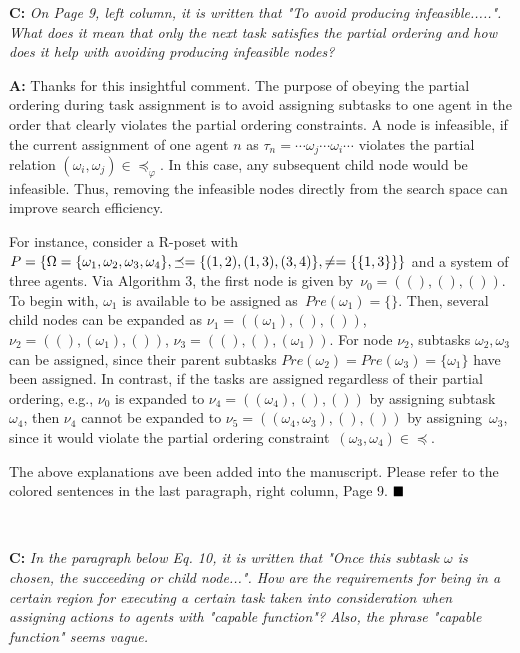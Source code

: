 \documentclass[10pt]{article}
\begin{document}


\textbf{C:}
\emph{On Page 9, left column, it is written that "To avoid producing
	infeasible.....". What does it mean that only the next task satisfies
	the partial ordering and how does it help with avoiding producing
	infeasible nodes?
}

\textbf{A:} Thanks for this insightful comment.
The purpose of obeying the partial ordering during task assignment
is to avoid assigning subtasks to one agent in the order that clearly
violates the partial ordering constraints. A node is infeasible,
if the current assignment of one agent $n$ as $\tau_n=\cdots\omega_j\cdots\omega_i\cdots$ violates the partial relation $(\omega_i,\omega_j)\in\preceq_\varphi$.
In this case, any subsequent child node would be infeasible.
Thus, removing the infeasible nodes directly from the search space can
improve search efficiency.

For instance,
consider a R-poset with $P=\{\Omega=\{\omega_1,\omega_2,\omega_3,\omega_4\},
\preceq=\{(1,2),\\(1,3),(3,4)\}, \neq=\{\{1,3\}\}\}$ and a system of three agents.
Via Algorithm 3, the first node is given by~$\nu_0=((),(),())$.
To begin with, $\omega_1$ is available to be assigned as~$Pre(\omega_1)=\{\}$.
Then, several child nodes can be expanded as
$\nu_1=((\omega_1),(),())$, $\nu_2=((),(\omega_1),())$, $\nu_3=((),(),(\omega_1))$.
For node $\nu_2$, subtasks $\omega_2,\omega_3$
can be assigned, since their parent subtasks $Pre(\omega_2)=Pre(\omega_3)=\{\omega_1\}$ have been assigned.
In contrast, if the tasks are assigned regardless of their partial ordering, e.g.,
$\nu_0$ is expanded to $\nu_4=((\omega_4),(),())$ by assigning subtask~$\omega_4$, then
$\nu_4$ cannot be expanded to $\nu_5=((\omega_4, \omega_3),(),())$ by assigning~$\omega_3$,
since it would violate the partial ordering constraint~$(\omega_3,\omega_4)\in\preceq$.

The above explanations ave been added into the manuscript.
Please refer to the colored sentences in the last paragraph, right column, Page 9.
$\hfill\blacksquare$

\hspace*{\fill} \

\textbf{C:}
\emph{In the paragraph below Eq. 10, it is written that "Once this
  subtask $\omega$ is chosen, the succeeding or child node...".
  How are the
	requirements for being in a certain region for executing a certain task
	taken into consideration when assigning actions to agents with "capable
	function"? Also, the phrase "capable function" seems vague.}
\end{document}
